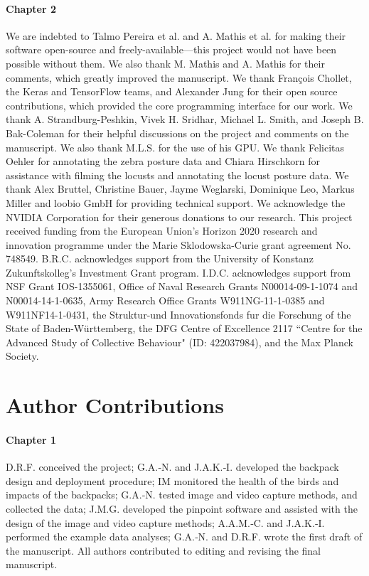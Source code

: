 \documentclass[11pt,a4paper,oneside]{article}
\begin{document}
\paragraph{Chapter 2}
We are indebted to Talmo Pereira et al. and A. Mathis et al. for making their software open-source and freely-available---this project would not have been possible without them. We also thank M. Mathis and A. Mathis for their comments, which greatly improved the manuscript. We thank Fran\c{c}ois Chollet, the Keras and TensorFlow teams, and Alexander Jung for their open source contributions, which provided the core programming interface for our work. We thank A. Strandburg-Peshkin, Vivek H. Sridhar, Michael L. Smith, and Joseph B. Bak-Coleman for their helpful discussions on the project and comments on the manuscript. We also thank M.L.S. for the use of his GPU. We thank Felicitas Oehler for annotating the zebra posture data and Chiara Hirschkorn for assistance with filming the locusts and annotating the locust posture data. We thank Alex Bruttel, Christine Bauer, Jayme Weglarski, Dominique Leo, Markus Miller and loobio GmbH for providing technical support. We acknowledge the NVIDIA Corporation for their generous donations to our research. This project received funding from the European Union's Horizon 2020 research and innovation programme under the Marie Sklodowska-Curie grant agreement No. 748549. B.R.C. acknowledges support from the University of Konstanz Zukunftskolleg's Investment Grant program. I.D.C. acknowledges support from NSF Grant IOS-1355061, Office of Naval Research Grants N00014-09-1-1074 and N00014-14-1-0635, Army Research Office Grants W911NG-11-1-0385 and W911NF14-1-0431, the Struktur-und Innovationsfonds fur die Forschung of the State of Baden-W\"urttemberg, the DFG Centre of Excellence 2117 “Centre for the Advanced Study of Collective Behaviour" (ID: 422037984), and the Max Planck Society.

\section{Author Contributions}
\paragraph{Chapter 1}
D.R.F. conceived the project; G.A.‐N. and J.A.K.‐I. developed the backpack design and deployment procedure; IM monitored the health of the birds and impacts of the backpacks; G.A.‐N. tested image and video capture methods, and collected the data; J.M.G. developed the pinpoint software and assisted with the design of the image and video capture methods; A.A.M.‐C. and J.A.K.‐I. performed the example data analyses; G.A.‐N. and D.R.F. wrote the first draft of the manuscript. All authors contributed to editing and revising the final manuscript.
\end{document}
